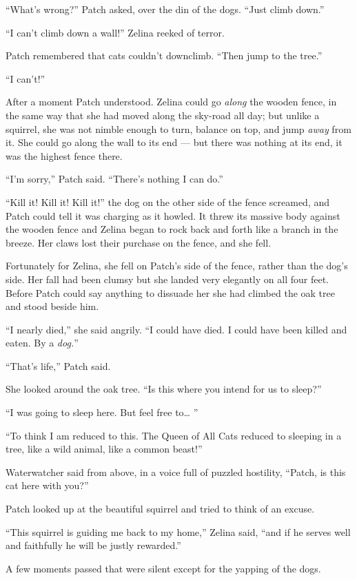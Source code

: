 \documentclass[ebook,oneside,openany,12pt]{memoir}
\begin{document}
“What’s wrong?” Patch asked, over the din of the dogs. “Just climb
down.”

“I can’t climb down a wall!” Zelina reeked of terror.

Patch remembered that cats couldn’t downclimb. “Then jump to the
tree.”

“I can’t!”

After a moment Patch understood. Zelina could go \emph{along} the
wooden fence, in the same way that she had moved along the sky-road
all day; but unlike a squirrel, she was not nimble enough to turn,
balance on top, and jump \emph{away} from it. She could go along the
wall to its end — but there was nothing at its end, it was the highest
fence there.

“I’m sorry,” Patch said. “There’s nothing I can do.”

“Kill it! Kill it! Kill it!” the dog on the other side of the fence
screamed, and Patch could tell it was charging as it howled. It threw
its massive body against the wooden fence and Zelina began to rock
back and forth like a branch in the breeze. Her claws lost their
purchase on the fence, and she fell.

Fortunately for Zelina, she fell on Patch’s side of the fence, rather
than the dog’s side. Her fall had been clumsy but she landed very
elegantly on all four feet. Before Patch could say anything to
dissuade her she had climbed the oak tree and stood beside him.

“I nearly died,” she said angrily. “I could have died. I could have
been killed and eaten. By a \emph{dog.}”

“That’s life,” Patch said.

She looked around the oak tree. “Is this where you intend for us to
sleep?”

“I was going to sleep here. But feel free to… ”

“To think I am reduced to this. The Queen of All Cats reduced to
sleeping in a tree, like a wild animal, like a common beast!”

Waterwatcher said from above, in a voice full of puzzled hostility,
“Patch, is this cat here with you?”

Patch looked up at the beautiful squirrel and tried to think of an
excuse.

“This squirrel is guiding me back to my home,” Zelina said, “and if he
serves well and faithfully he will be justly rewarded.”

A few moments passed that were silent except for the yapping of the
dogs.
\end{document}
